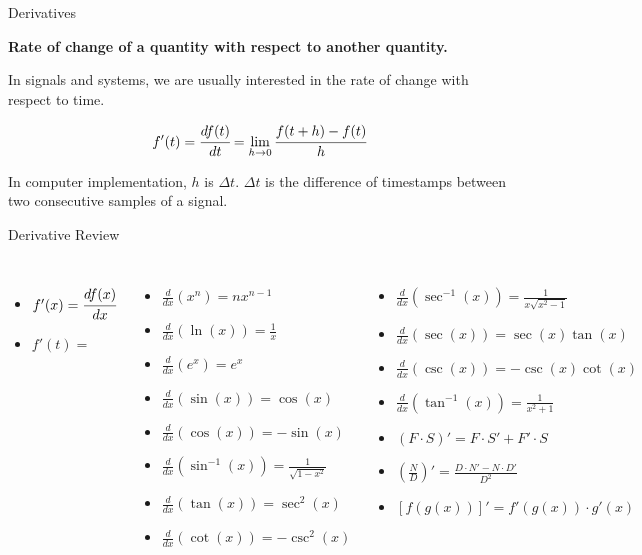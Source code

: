 \documentclass[aspectratio=169,xcolor=dvipsnames,svgnames,x11names,fleqn]{beamer}
\begin{document}
\begin{frame}{Derivatives}

\begin{center}
\bf
    Rate of change of a quantity with respect to another quantity.


\par In signals and systems, we are usually interested in the rate of change with respect to time.

$$
f'(t) = \cfrac{df(t)}{dt} = \lim_{h \to 0}\cfrac{f(t+h) - f(t)}{h}
$$

\begin{gradbox}{}
    In computer implementation, $h$ is $\Delta t$. $\Delta t$ is the difference of timestamps between two consecutive samples of a signal. 
\end{gradbox}
\end{center}
\end{frame}


\begin{frame}{Derivative Review}
 \begin{columns}
\begin{itemize}
        
    \item $f'(x) = \cfrac{d f(x)}{dx}$
    \item $f'(t) = $
\end{itemize}

\begin{itemize}
    \item $\frac{d}{dx}(x^n) = nx^{n-1}$
    \item $\frac{d}{dx}(\ln(x)) = \frac{1}{x}$
    \item $\frac{d}{dx}(e^x) = e^x$
    \item $\frac{d}{dx}(\sin(x)) = \cos(x)$
    \item $\frac{d}{dx}(\cos(x)) = -\sin(x)$
    \item $\frac{d}{dx}(\sin^{-1}(x)) = \frac{1}{\sqrt{1 - x^2}}$
    \item $\frac{d}{dx}(\tan(x)) = \sec^2(x)$
    \item $\frac{d}{dx}(\cot(x)) = -\csc^2(x)$
    \end{itemize}


\begin{itemize}
\item $\frac{d}{dx}(\sec^{-1}(x)) = \frac{1}{x\sqrt{x^2 - 1}}$
    \item $\frac{d}{dx}(\sec(x)) = \sec(x) \tan(x)$
    \item $\frac{d}{dx}(\csc(x)) = -\csc(x) \cot(x)$
    \item $\frac{d}{dx}(\tan^{-1}(x)) = \frac{1}{x^2 + 1}$
    \item $(F \cdot S)' = F \cdot S' + F' \cdot S$
    \item $\left(\frac{N}{D}\right)' = \frac{D \cdot N' - N \cdot D'}{D^2}$
    \item $[f(g(x))]' = f'(g(x)) \cdot g'(x)$
\end{itemize}
\end{columns}
\end{frame}
\end{document}
